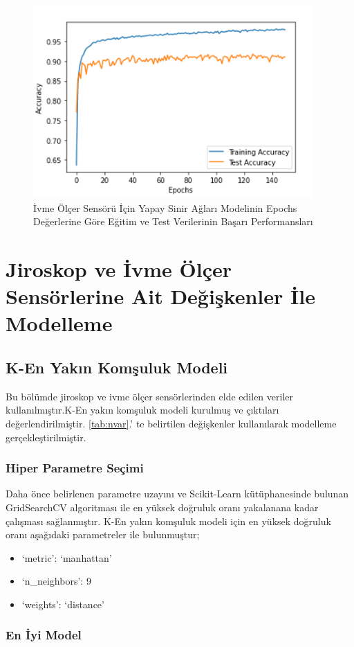 \documentclass[12pt,twoside]{deuthesis}
\providecommand{\tightlist}{%
  \setlength{\itemsep}{0pt}\setlength{\parskip}{0pt}}
\begin{document}
\begin{figure}

{\centering \includegraphics[width=0.6\linewidth,height=0.25\textheight]{figure/iysa_testtrain} 

}

\caption{İvme Ölçer Sensörü İçin Yapay Sinir Ağları Modelinin Epochs Değerlerine Göre Eğitim ve Test Verilerinin Başarı Performansları}\label{fig:iysatesttrain}
\end{figure}
\hypertarget{jiroskop-ve-ivme-uxf6luxe7er-sensuxf6rlerine-ait-deux11fiux15fkenler-ile-modelleme}{%
\section{Jiroskop ve İvme Ölçer Sensörlerine Ait Değişkenler İle Modelleme}\label{jiroskop-ve-ivme-uxf6luxe7er-sensuxf6rlerine-ait-deux11fiux15fkenler-ile-modelleme}}

\hypertarget{k-en-yakux131n-komux15fuluk-modeli-1}{%
\subsection{K-En Yakın Komşuluk Modeli}\label{k-en-yakux131n-komux15fuluk-modeli-1}}

Bu bölümde jiroskop ve ivme ölçer sensörlerinden elde edilen veriler kullanılmıştır.K-En yakın komşuluk modeli kurulmuş ve çıktıları değerlendirilmiştir.
\ref{tab:nvar}.' te belirtilen değişkenler kullanılarak modelleme gerçekleştirilmiştir.

\hypertarget{hiper-parametre-seuxe7imi-8}{%
\subsubsection{Hiper Parametre Seçimi}\label{hiper-parametre-seuxe7imi-8}}

Daha önce belirlenen parametre uzayını ve Scikit-Learn kütüphanesinde bulunan GridSearchCV algoritması ile en yüksek doğruluk oranı yakalanana kadar çalışması sağlanmıştır.
K-En yakın komşuluk modeli için en yüksek doğruluk oranı aşağıdaki parametreler ile bulunmuştur;
\begin{itemize}
\tightlist
\item
  `metric': `manhattan'
\item
  `n\_neighbors': 9
\item
  `weights': `distance'
\end{itemize}
\hypertarget{en-iyi-model-10}{%
\subsubsection{En İyi Model}\label{en-iyi-model-10}}
\end{document}
